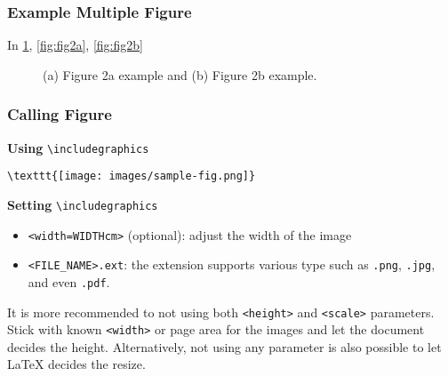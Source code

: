 \documentclass{beamer}
\begin{document}
\begin{frame}[fragile]
  \frametitle{Example Multiple Figure}

  In \ref{fig:fig2}, \ref{fig:fig2a}, \ref{fig:fig2b}

\begin{figure}[t]
  \centering
      \hspace*{-1.2em}  %
  \caption{(a) Figure 2a example and (b) Figure 2b example.}
  \label{fig:fig2}
\end{figure}

\end{frame}

\begin{frame}[fragile]
    \frametitle{Calling Figure}
  
    \textbf{Using} \verb|\includegraphics|
  
    \begin{block}{}
      \vspace{-2em}
      \small
      \begin{verbatim}
\texttt{[image: images/sample-fig.png]}
      \end{verbatim}
    \end{block}
  
    \textbf{Setting} \verb|\includegraphics|
  
    \begin{itemize}
      \item \verb|<width=WIDTHcm>| (optional): adjust the width of the image 
      \item \verb|<FILE_NAME>.ext|: the extension supports various type such as \texttt{.png}, \texttt{.jpg}, and even \texttt{.pdf}. 
    \end{itemize}
  
    It is more recommended to not using both \texttt{<height>} and \texttt{<scale>} parameters. Stick with known \texttt{<width>} or page area for the images and let the document decides the height. Alternatively, not using any parameter is also possible to let LaTeX decides the resize.
  
  \end{frame}
\end{document}
